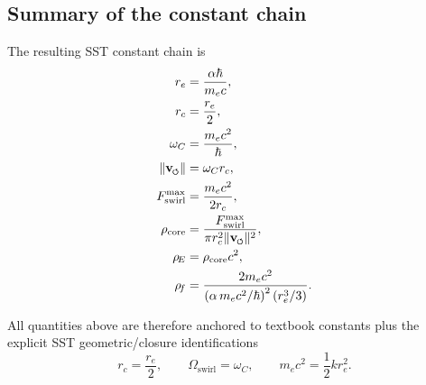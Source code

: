 \documentclass[11pt]{article}
\newcommand{\vswirl}{\mathbf{v}_{\mkern-2mu\scriptscriptstyle\boldsymbol{\circlearrowleft}}}
\newcommand{\rhoF}{\rho_{\!f}}\newcommand{\rhof}{\rho_{\!f}}     %
\newcommand{\rhoE}{\rho_{\!E}}\newcommand{\rhoe}{\rho_{\!E}}                           %
\newcommand{\rc}{r_c}                                    %
\begin{document}
    \subsection{Summary of the constant chain}
    The resulting SST constant chain is
    \begin{align}
        r_e &= \frac{\alpha\hbar}{m_e c}, \\
        \rc &= \frac{r_e}{2}, \\
        \omega_C &= \frac{m_e c^2}{\hbar}, \\
        \lVert\vswirl\rVert &= \omega_C \rc, \\
        F_{\text{swirl}}^{\max} &= \frac{m_e c^2}{2\rc}, \\
        \rho_{\text{core}} &= \frac{F_{\text{swirl}}^{\max}}{\pi \rc^2 \lVert\vswirl\rVert^2}, \\
        \rhoE &= \rho_{\text{core}}c^2, \\
        \rhoF &= \frac{2 m_e c^2}{\left(\alpha \, m_e c^2/\hbar\right)^2 (r_e^3/3)}.
    \end{align}

    All quantities above are therefore anchored to textbook constants plus the explicit SST geometric/closure identifications
    \[
        \rc=\frac{r_e}{2},
        \qquad
        \Omega_{\text{swirl}}=\omega_C,
        \qquad
        m_ec^2=\frac12 k r_e^2.
    \]
\end{document}
